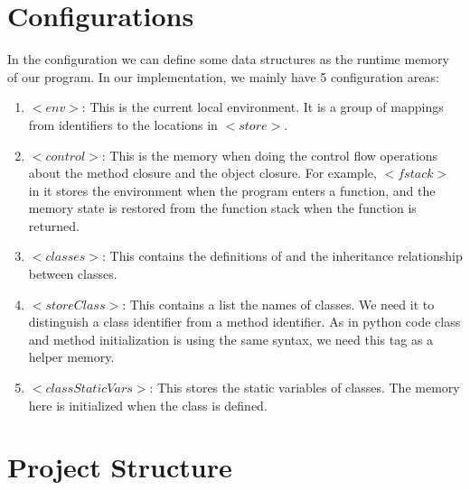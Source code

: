 \documentclass[a4paper]{article}
\begin{document}
\section{Configurations}
In the configuration we can define some data structures as the runtime memory of our program. In our implementation, we mainly have 5 configuration areas:

\begin{enumerate}
    \item $<env>$: This is the current local environment. It is a group of mappings from identifiers to the locations in $<store>$.
    \item $<control>$: This is the memory when doing the control flow operations about the method closure and the object closure. For example, $<fstack>$ in it stores the environment when the program enters a function, and the memory state is restored from the function stack when the function is returned.
    \item $<classes>$: This contains the definitions of and the inheritance relationship between classes.
    \item $<storeClass>$: This contains a list the names of classes. We need it to distinguish a class identifier from a method identifier. As in python code class and method initialization is using the same syntax, we need this tag as a helper memory.
    \item $<classStaticVars>$: This stores the static variables of classes. The memory here is initialized when the class is defined.
\end{enumerate}

\section{Project Structure}
\end{document}
